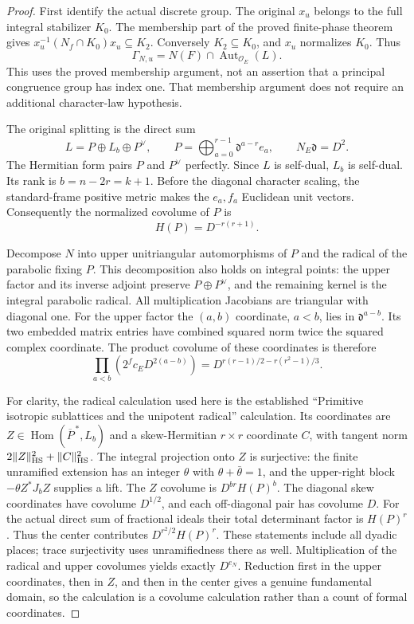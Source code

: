 \begin{proof}
First identify the actual discrete group.  The original
$x_u$ belongs to the full integral stabilizer $K_0$.
The membership part of the proved finite-phase theorem gives
$x_u^{-1}(N_f\cap K_0)x_u\subseteq K_2$.
Conversely $K_2\subseteq K_0$, and $x_u$ normalizes $K_0$.
Thus
\[
              \Gamma_{N,u}=N(F)\cap\operatorname{Aut}_{\mathcal O_E}(L).
\]
This uses the proved membership argument, not an assertion that a
principal congruence group has index one.  That membership argument
does not require an additional character-law hypothesis.

The original splitting is the direct sum
\[
 L=P\oplus L_b\oplus P^\vee,\qquad
 P=\bigoplus_{a=0}^{r-1}\mathfrak d^{a-r}e_a,
 \qquad N_E\mathfrak d=D^2.
\]
The Hermitian form pairs $P$ and $P^\vee$ perfectly.  Since $L$
is self-dual, $L_b$ is self-dual.  Its rank is $b=n-2r=k+1$.
Before the diagonal character scaling, the standard-frame
positive metric makes the $e_a,f_a$ Euclidean unit vectors.
Consequently the normalized covolume of $P$ is
\[
                    H(P)=D^{-r(r+1)}.
\]

Decompose $N$ into upper unitriangular automorphisms of $P$ and
the radical of the parabolic fixing $P$.  This decomposition
also holds on integral points: the upper factor and its inverse
adjoint preserve $P\oplus P^\vee$, and the remaining kernel is
the integral parabolic radical.  All multiplication Jacobians
are triangular with diagonal one.
For the upper factor the $(a,b)$ coordinate, $a<b$, lies in
$\mathfrak d^{a-b}$.  Its two embedded matrix entries have
combined squared norm twice the squared complex coordinate.
The product covolume of these coordinates is therefore
\[
 \prod_{a<b}(2^f c_E D^{2(a-b)})
       =D^{r(r-1)/2-r(r^2-1)/3}.
\]

For clarity, the radical calculation used here is the established
``Primitive isotropic sublattices and the unipotent radical''
calculation.\cite{current-construction-record}
Its coordinates are $Z\in\operatorname{Hom}(\overline P^{\,*},L_b)$
and a skew-Hermitian $r\times r$ coordinate $C$, with tangent
norm $2\|Z\|_{\rm HS}^2+\|C\|_{\rm HS}^2$.
The integral projection onto $Z$ is surjective: the finite
unramified extension has an integer $\theta$ with
$\theta+\bar\theta=1$, and the upper-right block
$-\theta Z^*J_bZ$ supplies a lift.
The $Z$ covolume is $D^{br}H(P)^b$.
The diagonal skew coordinates have covolume $D^{1/2}$,
and each off-diagonal pair has covolume $D$.
For the actual direct sum of fractional ideals their total
determinant factor is $H(P)^r$.  Thus the center contributes
$D^{r^2/2}H(P)^r$.
These statements include all dyadic places; trace surjectivity
uses unramifiedness there as well.
Multiplication of the radical and upper covolumes yields exactly
$D^{e_N}$.  Reduction first in the upper coordinates, then in
$Z$, and then in the center gives a genuine fundamental domain,
so the calculation is a covolume calculation rather than a
count of formal coordinates.


\end{proof}
